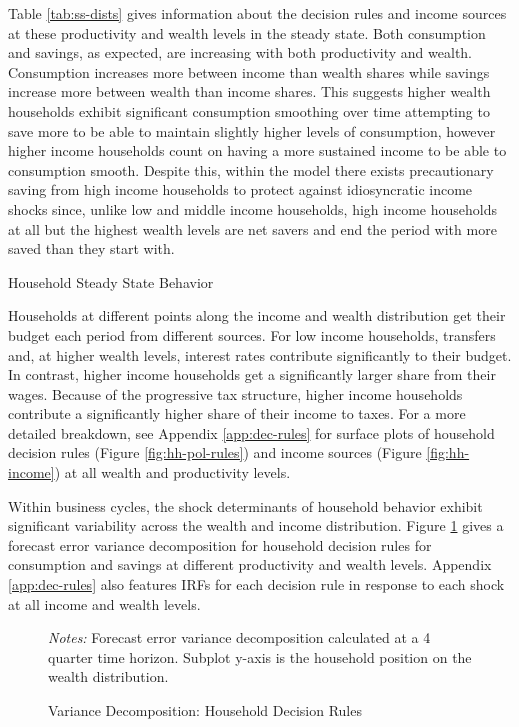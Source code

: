 Table \ref{tab:ss-dists} gives information about the decision rules and income sources at these productivity and wealth levels in the steady state. Both consumption and savings, as expected, are increasing with both productivity and wealth. Consumption increases more between income than wealth shares while savings increase more between wealth than income shares. This suggests higher wealth households exhibit significant consumption smoothing over time attempting to save more to be able to maintain slightly higher levels of consumption, however higher income households count on having a more sustained income to be able to consumption smooth. Despite this, within the model there exists precautionary saving from high income households to protect against idiosyncratic income shocks since, unlike low and middle income households, high income households at all but the highest wealth levels are net savers and end the period with more saved than they start with.

\begin{table}[t]
    \centering
    \caption{Household Steady State Behavior}
    
    \label{tab:ss-dists}
\end{table}

Households at different points along the income and wealth distribution get their budget each period from different sources. For low income households, transfers and, at higher wealth levels, interest rates contribute significantly to their budget. In contrast, higher income households get a significantly larger share from their wages. Because of the progressive tax structure, higher income households contribute a significantly higher share of their income to taxes. For a more detailed breakdown, see Appendix \ref{app:dec-rules} for surface plots of household decision rules (Figure \ref{fig:hh-pol-rules}) and income sources (Figure \ref{fig:hh-income}) at all wealth and productivity levels.

Within business cycles, the shock determinants of household behavior exhibit significant variability across the wealth and income distribution. Figure \ref{fig:hh-var-decomp} gives a forecast error variance decomposition for household decision rules for consumption and savings at different productivity and wealth levels. Appendix \ref{app:dec-rules} also features IRFs for each decision rule in response to each shock at all income and wealth levels. 

\begin{figure}[t!]  %
    \centering
    \caption{Variance Decomposition: Household Decision Rules}
    
    {\scriptsize \textit{Notes:} Forecast error variance decomposition calculated at a 4 quarter time horizon. Subplot y-axis is the household position on the wealth distribution.}
    \label{fig:hh-var-decomp}
\end{figure}

